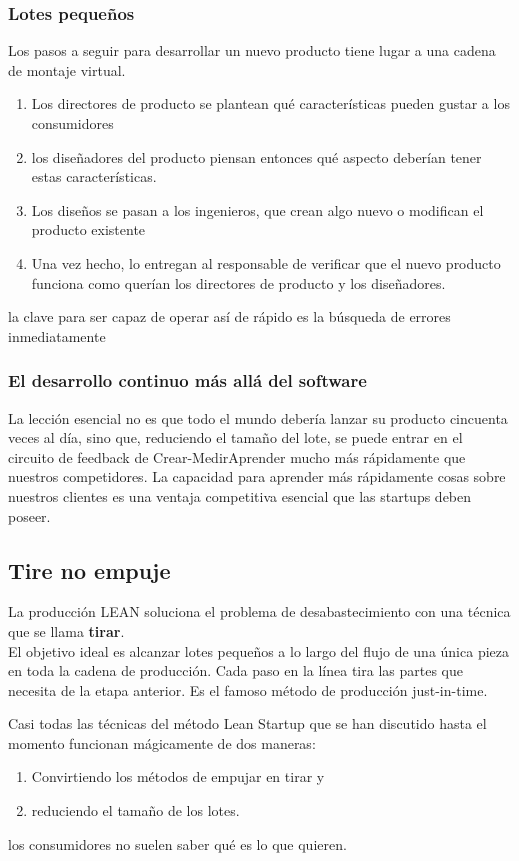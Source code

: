 \documentclass[10pt]{article}
\begin{document}
\begin{multicols}{2}
\subsubsection*{Lotes pequeños}
Los pasos a seguir para desarrollar un nuevo producto tiene lugar a una cadena de montaje virtual. 
\begin{enumerate}[\bfseries P1.]
\item Los directores de producto se plantean qué características pueden gustar a los consumidores
\item los diseñadores del producto piensan entonces qué aspecto deberían tener estas características.
\item Los diseños se pasan a los ingenieros, que crean algo nuevo o modifican el producto existente
\item Una vez hecho, lo entregan al responsable de verificar que el nuevo producto funciona como querían los directores de producto
y los diseñadores.
\end{enumerate}
{\color{blue}la clave para ser capaz de operar así de rápido es la búsqueda de errores inmediatamente}
\subsubsection*{El desarrollo continuo más allá del software}
La lección esencial no es que todo el mundo debería lanzar su producto cincuenta veces al día, sino que, reduciendo el tamaño del lote, se puede entrar en el circuito de feedback de Crear-MedirAprender mucho más rápidamente que nuestros competidores. La capacidad para aprender más rápidamente cosas sobre nuestros clientes es una ventaja competitiva esencial que las startups deben poseer.
\subsection*{Tire no empuje}
La producción LEAN soluciona el problema de desabastecimiento con una técnica que se llama \textbf{tirar}. \\
El objetivo ideal es alcanzar lotes pequeños a lo largo del flujo de una única pieza en toda la cadena de producción. Cada paso en la línea tira las partes que necesita de la etapa anterior. Es el famoso método de producción just-in-time.\\
{\color{blue}Casi todas las técnicas del método Lean Startup que se han discutido hasta el momento funcionan mágicamente de dos maneras:
\begin{enumerate}
\item Convirtiendo los métodos de empujar en tirar y
\item reduciendo el tamaño de los lotes.
\end{enumerate}}
los consumidores no suelen saber qué es lo que quieren. 

\end{multicols}
\end{document}
